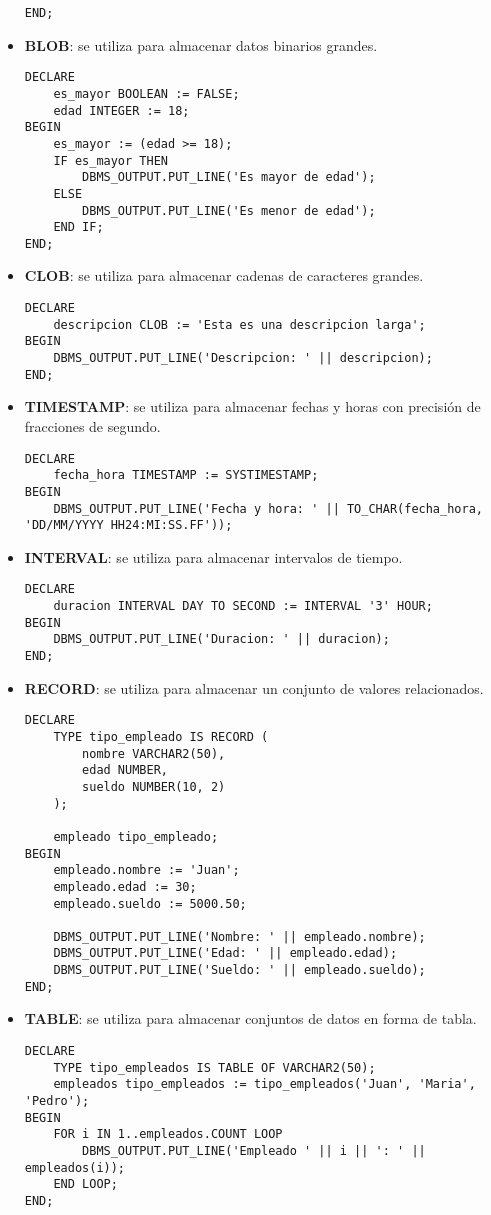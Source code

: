 \documentclass[executivepaper]{article}
\begin{document}
\begin{itemize}
\begin{lstlisting}
END;    
\end{lstlisting}
    \item \textbf{BLOB}: se utiliza para almacenar datos binarios grandes.
\begin{lstlisting}
DECLARE
    es_mayor BOOLEAN := FALSE;
    edad INTEGER := 18;
BEGIN
    es_mayor := (edad >= 18);
    IF es_mayor THEN
        DBMS_OUTPUT.PUT_LINE('Es mayor de edad');
    ELSE
        DBMS_OUTPUT.PUT_LINE('Es menor de edad');
    END IF;
END;
\end{lstlisting}
    \item \textbf{CLOB}: se utiliza para almacenar cadenas de caracteres grandes.
\begin{lstlisting}
DECLARE
    descripcion CLOB := 'Esta es una descripcion larga';
BEGIN
    DBMS_OUTPUT.PUT_LINE('Descripcion: ' || descripcion);
END;
\end{lstlisting}
    \item \textbf{TIMESTAMP}: se utiliza para almacenar fechas y horas con precisión de fracciones de segundo.
\begin{lstlisting}
DECLARE
    fecha_hora TIMESTAMP := SYSTIMESTAMP;
BEGIN
    DBMS_OUTPUT.PUT_LINE('Fecha y hora: ' || TO_CHAR(fecha_hora, 'DD/MM/YYYY HH24:MI:SS.FF'));
\end{lstlisting}
    \item \textbf{INTERVAL}: se utiliza para almacenar intervalos de tiempo.
\begin{lstlisting}
DECLARE
    duracion INTERVAL DAY TO SECOND := INTERVAL '3' HOUR;
BEGIN
    DBMS_OUTPUT.PUT_LINE('Duracion: ' || duracion);
END;
\end{lstlisting}
    \item \textbf{RECORD}: se utiliza para almacenar un conjunto de valores relacionados.
\begin{lstlisting}
DECLARE
    TYPE tipo_empleado IS RECORD (
        nombre VARCHAR2(50),
        edad NUMBER,
        sueldo NUMBER(10, 2)
    );

    empleado tipo_empleado;
BEGIN
    empleado.nombre := 'Juan';
    empleado.edad := 30;
    empleado.sueldo := 5000.50;

    DBMS_OUTPUT.PUT_LINE('Nombre: ' || empleado.nombre);
    DBMS_OUTPUT.PUT_LINE('Edad: ' || empleado.edad);
    DBMS_OUTPUT.PUT_LINE('Sueldo: ' || empleado.sueldo);
END;
\end{lstlisting}
    \item \textbf{TABLE}: se utiliza para almacenar conjuntos de datos en forma de tabla.
\begin{lstlisting}
DECLARE
    TYPE tipo_empleados IS TABLE OF VARCHAR2(50);
    empleados tipo_empleados := tipo_empleados('Juan', 'Maria', 'Pedro');
BEGIN
    FOR i IN 1..empleados.COUNT LOOP
        DBMS_OUTPUT.PUT_LINE('Empleado ' || i || ': ' || empleados(i));
    END LOOP;
END;
\end{lstlisting}
\end{itemize}
\end{document}
